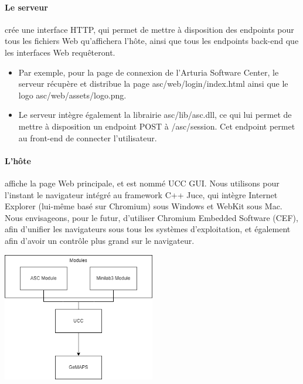 \documentclass[francais]{rapportPFE}  %
\begin{document}
\paragraph{Le serveur} crée une interface HTTP, qui permet de mettre à disposition des endpoints pour tous les fichiers Web qu'affichera l'hôte, ainsi que tous les endpoints back-end que les interfaces Web requêteront.
\begin{itemize}
    \item Par exemple, pour la page de connexion de l'Arturia Software Center, le serveur récupère et distribue la page asc/web/login/index.html ainsi que le logo asc/web/assets/logo.png. 
    \item Le serveur intègre également la librairie asc/lib/asc.dll, ce qui lui permet de mettre à disposition un endpoint POST à /asc/session. Cet endpoint permet au front-end de connecter l'utilisateur.
\end{itemize}



\paragraph{L'hôte} affiche la page Web principale, et est nommé UCC GUI. Nous utilisons pour l'instant le navigateur intégré au framework C++ Juce, qui intègre Internet Explorer (lui-même basé sur Chromium) sous Windows et WebKit sous Mac. Nous envisageons, pour le futur, d'utiliser Chromium Embedded Software (CEF), afin d'unifier les navigateurs sous tous les systèmes d'exploitation, et également afin d'avoir un contrôle plus grand sur le navigateur. 


\begin{center}
	\centering
	\includegraphics[width=0.5\textwidth]{graphics/gmaps.png}
	\begin{tiny}
	\end{tiny}
	\label{fig}
\end{center}
\end{document}
